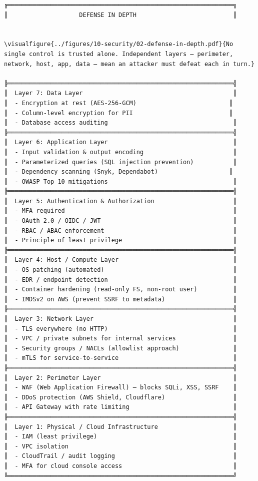 \documentclass[11pt]{article}
\begin{document}
\begin{verbatim}
╔═══════════════════════════════════════════════════════════════╗
║                    DEFENSE IN DEPTH                           ║


\visualfigure{../figures/10-security/02-defense-in-depth.pdf}{No single control is trusted alone. Independent layers — perimeter, network, host, app, data — mean an attacker must defeat each in turn.}

╠═══════════════════════════════════════════════════════════════╣
║  Layer 7: Data Layer                                          ║
║  - Encryption at rest (AES-256-GCM)                          ║
║  - Column-level encryption for PII                           ║
║  - Database access auditing                                   ║
╠═══════════════════════════════════════════════════════════════╣
║  Layer 6: Application Layer                                   ║
║  - Input validation & output encoding                         ║
║  - Parameterized queries (SQL injection prevention)           ║
║  - Dependency scanning (Snyk, Dependabot)                    ║
║  - OWASP Top 10 mitigations                                   ║
╠═══════════════════════════════════════════════════════════════╣
║  Layer 5: Authentication & Authorization                      ║
║  - MFA required                                               ║
║  - OAuth 2.0 / OIDC / JWT                                     ║
║  - RBAC / ABAC enforcement                                    ║
║  - Principle of least privilege                               ║
╠═══════════════════════════════════════════════════════════════╣
║  Layer 4: Host / Compute Layer                                ║
║  - OS patching (automated)                                    ║
║  - EDR / endpoint detection                                   ║
║  - Container hardening (read-only FS, non-root user)          ║
║  - IMDSv2 on AWS (prevent SSRF to metadata)                   ║
╠═══════════════════════════════════════════════════════════════╣
║  Layer 3: Network Layer                                       ║
║  - TLS everywhere (no HTTP)                                   ║
║  - VPC / private subnets for internal services                ║
║  - Security groups / NACLs (allowlist approach)               ║
║  - mTLS for service-to-service                                ║
╠═══════════════════════════════════════════════════════════════╣
║  Layer 2: Perimeter Layer                                     ║
║  - WAF (Web Application Firewall) — blocks SQLi, XSS, SSRF    ║
║  - DDoS protection (AWS Shield, Cloudflare)                   ║
║  - API Gateway with rate limiting                             ║
╠═══════════════════════════════════════════════════════════════╣
║  Layer 1: Physical / Cloud Infrastructure                     ║
║  - IAM (least privilege)                                      ║
║  - VPC isolation                                              ║
║  - CloudTrail / audit logging                                 ║
║  - MFA for cloud console access                               ║
╚═══════════════════════════════════════════════════════════════╝


\end{verbatim}
\end{document}
